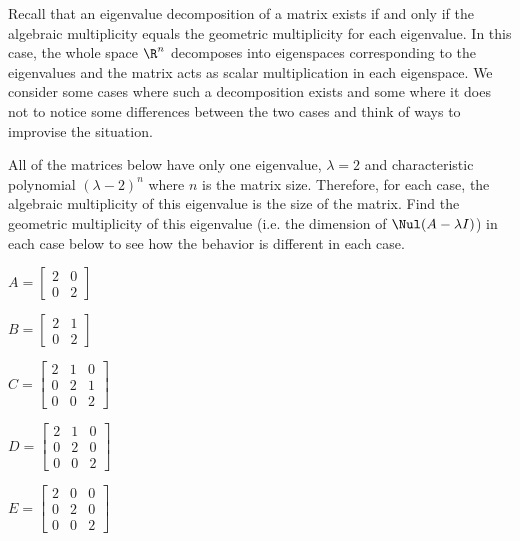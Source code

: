 \label{sec:eigen_dne}

Recall that an eigenvalue decomposition of a matrix exists if and only if the algebraic multiplicity equals the geometric multiplicity for each eigenvalue. In this case, the whole space $\R^n$ decomposes into eigenspaces corresponding to the eigenvalues and the matrix acts as scalar multiplication in each eigenspace. We consider some cases where such a decomposition exists and some where it does not to notice some differences between the two cases and think of ways to improvise the situation. 

\begin{pa}\label{pa:JCF}
\be 
\item All of the matrices below have only one eigenvalue, $\lambda = 2$ and characteristic polynomial $(\lambda-2)^n$ where $n$ is the matrix size. Therefore, for each case, the algebraic multiplicity of this eigenvalue is the size of the matrix. Find the geometric multiplicity of this eigenvalue (i.e. the dimension of $\Nul(A-\lambda I)$) in each case below to see how the behavior is different in each case.\\

\ba 
\item $A = \left[ \begin{array}{cc} 2&0  \\ 0&2 \end{array} \right]$

\item $B = \left[ \begin{array}{cc} 2&1  \\ 0&2 \end{array} \right]$

\item $C = \left[ \begin{array}{ccc} 2&1&0 \\ 0&2&1 \\ 0&0&2 \end{array} \right]$

\item $D = \left[ \begin{array}{ccc} 2&1&0 \\ 0&2&0 \\ 0&0&2 \end{array} \right]$

\item $E = \left[ \begin{array}{ccc} 2&0&0 \\ 0&2&0 \\ 0&0&2 \end{array} \right]$


\end{pa}
